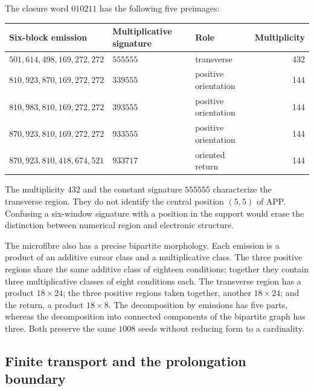 The closure word \(010211\) has the following five preimages:
\begin{center}\small
\begin{tabular}{@{}lll r@{}}\toprule
Six-block emission&Multiplicative signature&Role&Multiplicity\\\midrule
\(501,614,498,169,272,272\)&\(555555\)&transverse&432\\
\(810,923,870,169,272,272\)&\(339555\)&positive orientation&144\\
\(810,983,810,169,272,272\)&\(393555\)&positive orientation&144\\
\(870,923,810,169,272,272\)&\(933555\)&positive orientation&144\\
\(870,923,810,418,674,521\)&\(933717\)&oriented return&144\\\bottomrule
\end{tabular}
\end{center}
The multiplicity \(432\) and the constant signature \(555555\) characterize the transverse region. They do not identify the central position \((5,5)\) of APP. Confusing a six-window signature with a position in the support would erase the distinction between numerical region and electronic structure.

The microfibre also has a precise bipartite morphology. Each emission is a product of an additive cursor class and a multiplicative class. The three positive regions share the same additive class of eighteen conditions; together they contain three multiplicative classes of eight conditions each. The transverse region has a product \(18\times24\); the three positive regions taken together, another \(18\times24\); and the return, a product \(18\times8\). The decomposition by emissions has five parts, whereas the decomposition into connected components of the bipartite graph has three. Both preserve the same \(1008\) seeds without reducing form to a cardinality.

\subsection{Finite transport and the prolongation boundary}


